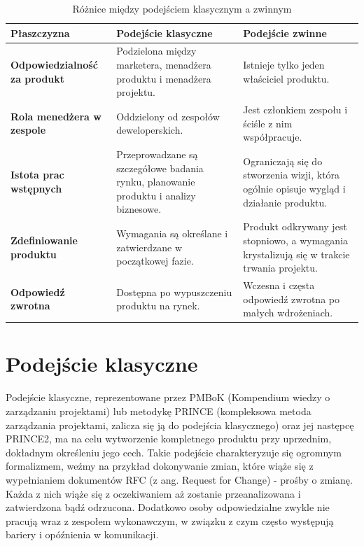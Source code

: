 \begin{table}
\centering\caption{Różnice między podejściem klasycznym a zwinnym\label{tabela:roznice}}
\begin{tabular}{ p{} p{}  p{} }%
\toprule
\textbf{Płaszczyzna} &\textbf{ Podejście klasyczne} & \textbf{Podejście zwinne} \\
\midrule
\textbf{Odpowiedzialność za produkt}
 & Podzielona między marketera, menadżera produktu i menadżera projektu.
 & Istnieje tylko jeden właściciel produktu. \\
\midrule
\textbf{Rola menedżera w zespole}
& Oddzielony od zespołów deweloperskich.
& Jest członkiem zespołu i ściśle z nim współpracuje.\\
\midrule
\textbf{Istota prac wstępnych}
& Przeprowadzane są szczegółowe badania rynku, planowanie produktu i analizy biznesowe.
& Ograniczają się do stworzenia wizji, która ogólnie opisuje wygląd i działanie produktu.\\
\midrule
\textbf{Zdefiniowanie produktu}
& Wymagania są określane i zatwierdzane w początkowej fazie.
& Produkt odkrywany jest stopniowo, a wymagania krystalizują się w trakcie trwania projektu.\\
\midrule
\textbf{Odpowiedź zwrotna}
& Dostępna po wypuszczeniu produktu na rynek.
& Wczesna i częsta odpowiedź zwrotna po małych wdrożeniach.\\
\bottomrule
\end{tabular}
\end{table}
\newpage

\section{Podejście klasyczne}

Podejście klasyczne, reprezentowane przez PMBoK (Kompendium wiedzy o zarządzaniu projektami) lub metodykę PRINCE
(kompleksowa metoda zarządzania projektami, zalicza się ją do podejścia klasycznego) oraz jej następcę PRINCE2,
ma na celu wytworzenie kompletnego produktu przy uprzednim, dokładnym określeniu jego cech.
Takie podejście charakteryzuje się ogromnym formalizmem, weźmy na przykład dokonywanie zmian,
które wiąże się z wypełnianiem dokumentów RFC (z ang. Request for Change) - prośby o zmianę.
Każda z nich wiąże się z oczekiwaniem aż zostanie przeanalizowana i zatwierdzona bądź odrzucona.
Dodatkowo osoby odpowiedzialne zwykle nie pracują wraz z zespołem wykonawczym,
w związku z czym często występują bariery i opóźnienia w komunikacji.
\cite{www_tradycyjne_projekty}

